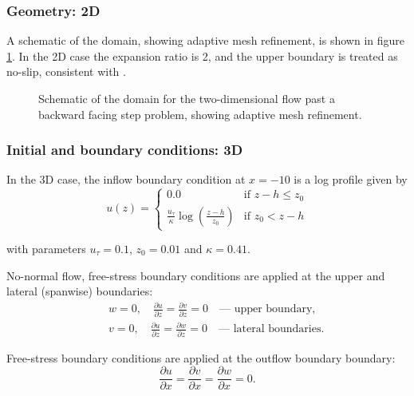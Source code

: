 \subsubsection{Geometry: 2D}
A schematic of the domain, showing adaptive mesh refinement, is shown in figure \ref{Fig:Schematic2d}.
In the 2D case the expansion ratio is 2, and the upper boundary is treated as no-slip,
consistent with \cite{armaly1983}.

\begin{figure}
\centering
{}
\caption{Schematic of the domain for the two-dimensional flow past a backward facing step
problem, showing adaptive mesh refinement.}
\label{Fig:Schematic2d}
\end{figure}


\subsubsection{Initial and boundary conditions: 3D}
In the 3D case, the inflow boundary condition at $x=-10$ is a log profile given by
\begin{equation*}
u(z) =
  \begin{cases}
    0.0 & \text{if } z-h \leq z_0 \\
    \frac{u_{\tau}}{\kappa} \log \left(\frac{z - h}{z_0}\right) & \text{if } z_0 < z-h
  \end{cases}
\end{equation*}

with parameters $u_{\tau} = 0.1$, $z_0 = 0.01$ and $\kappa = 0.41$.


No-normal flow, free-stress boundary conditions are applied at the upper and lateral
(spanwise) boundaries:
\begin{eqnarray*}
&&w=0,\quad \frac{\partial u}{\partial z} = \frac{\partial v}{\partial z} = 0 \quad\textrm{--- upper boundary},\\
&&v=0,\quad \frac{\partial u}{\partial z} = \frac{\partial w}{\partial z} = 0 \quad\textrm{--- lateral boundaries}.
\end{eqnarray*}

Free-stress boundary conditions are applied at the outflow boundary boundary:
\begin{equation*}
\frac{\partial u}{\partial x} = \frac{\partial v}{\partial x} = \frac{\partial w}{\partial x} = 0.
\end{equation*}


